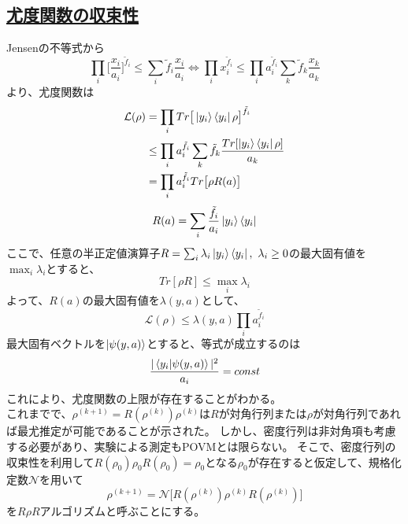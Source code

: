 \documentclass[11pt,a4j,notitlepage]{jreport}
\begin{document}
	\subsection*{\underline{尤度関数の収束性}}

	Jensenの不等式から
	\begin{equation}
		\prod_i \Big[ \frac{x_i}{a_i} \Big]^{\tilde{f}_i} \leq \sum_i \tilde{f}_i \frac{x_i}{a_i} \Longleftrightarrow \prod_i x_i^{\tilde{f}_i} \leq \prod_i a_i^{\tilde{f}_i} \sum_k \tilde{f}_k \frac{x_k}{a_k}
	\end{equation}
	より、尤度関数は
	\begin{equation}
		\begin{aligned}
			\mathcal{L} (\rho) &= \prod_i Tr \big[ \ket{y_i} \bra{y_i} \rho \big]^{\tilde{f}_i} \\
			&\leq \prod_i a_i^{\tilde{f}_i} \sum_k \tilde{f}_k \frac{Tr [ \ket{y_i} \bra{y_i} \rho]}{a_k} \\
			&= \prod_i a_i^{\tilde{f}_i} Tr \big[ \rho R (a) \big]
		\end{aligned}
	\end{equation}
	\begin{equation}
		R (a) = \sum_i \frac{\tilde{f}_i}{a_i} \ket{y_i} \bra{y_i}
	\end{equation}
	ここで、任意の半正定値演算子$R = \sum_i \lambda_i \ket{y_i} \bra{y_i},\ \lambda_i \geq 0$の最大固有値を$\max_i \lambda_i$とすると、
	\begin{equation}
		Tr [\rho R] \leq \max_i \lambda_i
	\end{equation}
	よって、$R (a)$の最大固有値を$\lambda (y, a)$として、
	\begin{equation}
		\mathcal{L} (\rho) \leq \lambda (y, a) \prod_i a_i^{\tilde{f}_i}
	\end{equation}
	最大固有ベクトルを$\ket{\psi(y, a)}$とすると、等式が成立するのは
	\begin{equation}
		\frac{| \braket{y_i | \psi (y, a)} |^2}{a_i} = const
	\end{equation}
	これにより、尤度関数の上限が存在することがわかる。\\

	これまでで、$\rho^{(k+1)} = R (\rho^{(k)}) \rho^{(k)}$は$R$が対角行列または$\rho$が対角行列であれば最尤推定が可能であることが示された。
	しかし、密度行列は非対角項も考慮する必要があり、実験による測定もPOVMとは限らない。
	そこで、密度行列の収束性を利用して$R (\rho_0) \rho_0 R (\rho_0) = \rho_0$となる$\rho_0$が存在すると仮定して、規格化定数$\mathcal{N}$を用いて
	\begin{equation}
		\rho^{(k+1)} = \mathcal{N} \big[ R (\rho^{(k)}) \rho^{(k)} R (\rho^{(k)}) \big]
	\end{equation}
	を$R \rho R$アルゴリズムと呼ぶことにする。
\end{document}
